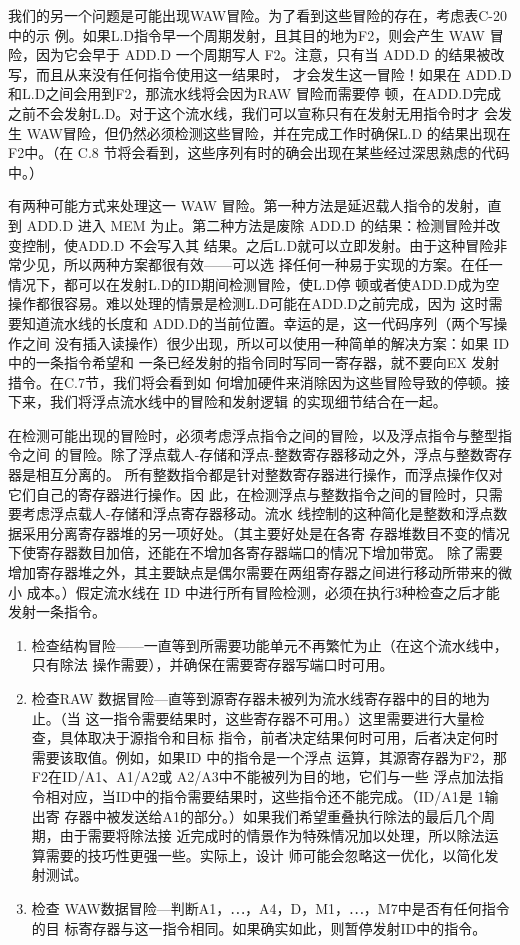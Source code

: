 我们的另一个问题是可能出现WAW冒险。为了看到这些冒险的存在，考虑表C-20中的示
例。如果L.D指令早一个周期发射，且其目的地为F2，则会产生 WAW 冒险，因为它会早于 ADD.D
一个周期写人 F2。注意，只有当 ADD.D 的结果被改写，而且从来没有任何指令使用这一结果时，
才会发生这一冒险！如果在 ADD.D和L.D之间会用到F2，那流水线将会因为RAW 冒险而需要停
顿，在ADD.D完成之前不会发射L.D。对于这个流水线，我们可以宣称只有在发射无用指令时才
会发生 WAW冒险，但仍然必须检测这些冒险，并在完成工作时确保L.D 的结果出现在F2中。（在
C.8 节将会看到，这些序列有时的确会出现在某些经过深思熟虑的代码中。）

有两种可能方式来处理这一 WAW 冒险。第一种方法是延迟载人指令的发射，直到 ADD.D
进入 MEM 为止。第二种方法是废除 ADD.D 的结果：检测冒险并改变控制，使ADD.D 不会写入其
结果。之后L.D就可以立即发射。由于这种冒险非常少见，所以两种方案都很有效——可以选
择任何一种易于实现的方案。在任一情况下，都可以在发射L.D的ID期间检测冒险，使L.D停
顿或者使ADD.D成为空操作都很容易。难以处理的情景是检测L.D可能在ADD.D之前完成，因为
这时需要知道流水线的长度和 ADD.D的当前位置。幸运的是，这一代码序列（两个写操作之间
没有插入读操作）很少出现，所以可以使用一种简单的解决方案：如果 ID 中的一条指令希望和
一条已经发射的指令同时写同一寄存器，就不要向EX 发射措令。在C.7节，我们将会看到如
何增加硬件来消除因为这些冒险导致的停顿。接下来，我们将浮点流水线中的冒险和发射逻辑
的实现细节结合在一起。

在检测可能出现的冒险时，必须考虑浮点指令之间的冒险，以及浮点指令与整型指令之间
的冒险。除了浮点载人-存储和浮点-整数寄存器移动之外，浮点与整数寄存器是相互分离的。
所有整数指令都是针对整数寄存器进行操作，而浮点操作仅对它们自己的寄存器进行操作。因
此，在检测浮点与整数指令之间的冒险时，只需要考虑浮点载人-存储和浮点寄存器移动。流水
线控制的这种简化是整数和浮点数据采用分离寄存器堆的另一项好处。（其主要好处是在各寄
存器堆数目不变的情况下使寄存器数目加倍，还能在不增加各寄存器端口的情况下增加带宽。
除了需要增加寄存器堆之外，其主要缺点是偶尔需要在两组寄存器之间进行移动所带来的微小
成本。）假定流水线在 ID 中进行所有冒险检测，必须在执行3种检查之后才能发射一条指令。

\begin{enumerate}
    \item 检查结构冒险——一直等到所需要功能单元不再繁忙为止（在这个流水线中，只有除法
    操作需要），并确保在需要寄存器写端口时可用。
    \item 检查RAW 数据冒险—直等到源寄存器未被列为流水线寄存器中的目的地为止。（当
    这一指令需要结果时，这些寄存器不可用。）这里需要进行大量检查，具体取决于源指令和目标
    指令，前者决定结果何时可用，后者决定何时需要该取值。例如，如果ID 中的指令是一个浮点
    运算，其源寄存器为F2，那F2在ID/A1、A1/A2或 A2/A3中不能被列为目的地，它们与一些
    浮点加法指令相对应，当ID中的指令需要结果时，这些指令还不能完成。（ID/A1是 1输出寄
    存器中被发送给A1的部分。）如果我们希望重叠执行除法的最后几个周期，由于需要将除法接
    近完成时的情景作为特殊情况加以处理，所以除法运算需要的技巧性更强一些。实际上，设计
    师可能会忽略这一优化，以简化发射测试。
    \item 检查 WAW数据冒险—判断A1，⋯，A4，D，M1，⋯，M7中是否有任何指令的目
    标寄存器与这一指令相同。如果确实如此，则暂停发射ID中的指令。
\end{enumerate}

